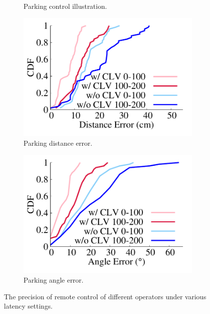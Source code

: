 \begin{figure}[ht]
\begin{subfigure}[t]{0.26\textwidth}
    \caption{Parking control illustration.}
    \label{consistent:illustration}
  \end{subfigure}%
  \begin{subfigure}[t]{0.26\textwidth}
    \includegraphics[width=\linewidth]{Figs/RTDrive/evaluation/Distance.pdf}
    \caption{Parking distance error.}
    \label{consistent:distance}
  \end{subfigure}%
  \begin{subfigure}[t]{0.26\textwidth}
    \includegraphics[width=\linewidth]{Figs/RTDrive/evaluation/Angle.pdf}
    \caption{Parking angle error.}
    \label{consistent:angle}
  \end{subfigure}%
  \caption{The precision of remote control of different operators under 
various latency settings.}
  \label{feasibility}
  \vspace{-0.2cm}
\end{figure}


